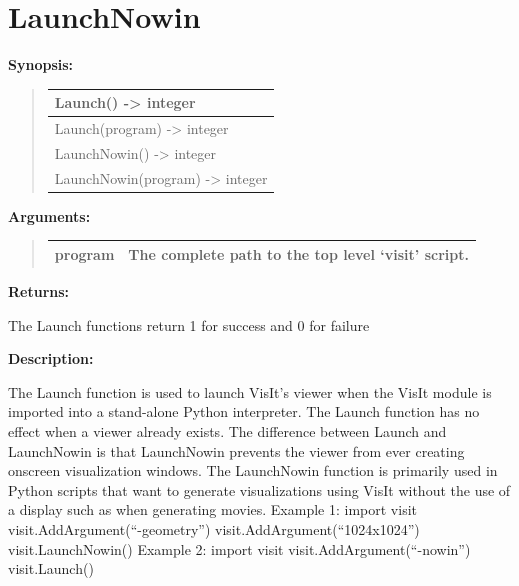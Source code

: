 \documentclass[letterpaper,10pt,english]{sphinxmanual}
\begin{document}
\begin{DUlineblock}{0em}
\item[] 
\end{DUlineblock}


\section{LaunchNowin}
\label{functions:launchnowin}
\begin{DUlineblock}{0em}
\item[] \textbf{Synopsis:}
\end{DUlineblock}
\begin{quote}

\begin{tabulary}{\linewidth}{|L|}
\hline

Launch() -\textgreater{} integer
\\
\hline
Launch(program) -\textgreater{} integer
\\
\hline
LaunchNowin() -\textgreater{} integer
\\
\hline
LaunchNowin(program) -\textgreater{} integer
\\
\hline\end{tabulary}

\end{quote}

\begin{DUlineblock}{0em}
\item[] 
\item[] \textbf{Arguments:}
\end{DUlineblock}
\begin{quote}

\begin{tabulary}{\linewidth}{|L|L|}
\hline

program
 & 
The complete path to the top level `visit' script.
\\
\hline\end{tabulary}

\end{quote}

\begin{DUlineblock}{0em}
\item[] 
\item[] \textbf{Returns:}
\item[] The Launch functions return 1 for success and 0 for failure
\item[] 
\item[] \textbf{Description:}
\item[] The Launch function is used to launch VisIt's viewer when the VisIt module
is imported into a stand-alone Python interpreter. The Launch function has
no effect when a viewer already exists. The difference between Launch and
LaunchNowin is that LaunchNowin prevents the viewer from ever creating
onscreen visualization windows. The LaunchNowin function is primarily used
in Python scripts that want to generate visualizations using VisIt without
the use of a display such as when generating movies.
Example 1:
import visit
visit.AddArgument(``-geometry'')
visit.AddArgument(``1024x1024'')
visit.LaunchNowin()
Example 2:
import visit
visit.AddArgument(``-nowin'')
visit.Launch()
\end{DUlineblock}
\end{document}
